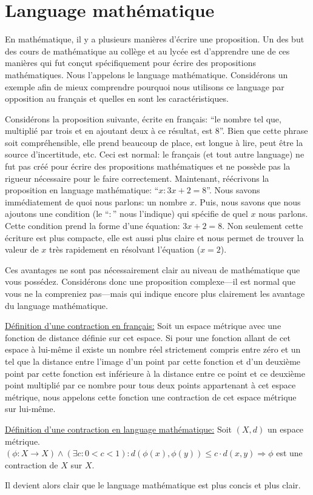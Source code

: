 \section{Language mathématique}

En mathématique, il y a plusieurs manières d'écrire une proposition. Un des but des cours de mathématique au collège et au lycée est d'apprendre une de ces manières qui fut conçut spécifiquement pour écrire des propositions mathématiques. Nous l'appelons le language mathématique. Considérons un exemple afin de mieux comprendre pourquoi nous utilisons ce language par opposition au français et quelles en sont les caractéristiques.

Considérons la proposition suivante, écrite en français: ``le nombre tel que, multiplié par trois et en ajoutant deux à ce résultat, est 8''. Bien que cette phrase soit compréhensible, elle prend beaucoup de place, est longue à lire, peut être la source d'incertitude, etc. Ceci est normal: le français (et tout autre language) ne fut pas créé pour écrire des propositions mathématiques et ne possède pas la rigueur nécessaire pour le faire correctement. Maintenant, réécrivons la proposition en language mathématique: ``$x : 3x+2 = 8$''. Nous savons immédiatement de quoi nous parlons: un nombre $x$. Puis, nous savons que nous ajoutons une condition (le ``$:$'' nous l'indique) qui spécifie de quel $x$ nous parlons. Cette condition prend la forme d'une équation: $3x+2 = 8$. Non seulement cette écriture est plus compacte, elle est aussi plus claire et nous permet de trouver la valeur de $x$ très rapidement en résolvant l'équation ($x = 2$).

\begin{exemple}
    Ces avantages ne sont pas nécessairement clair au niveau de mathématique que vous possédez. Considérons donc une proposition complexe---il est normal que vous ne la compreniez pas---mais qui indique encore plus clairement les avantage du language mathématique.

    \underline{Définition d'une contraction en français:} Soit un espace métrique avec une fonction de distance définie sur cet espace. Si pour une fonction allant de cet espace à lui-même il existe un nombre réel strictement compris entre zéro et un tel que la distance entre l'image d'un point par cette fonction et d'un deuxième point par cette fonction est inférieure à la distance entre ce point et ce deuxième point multiplié par ce nombre pour tous deux points appartenant à cet espace métrique, nous appelons cette fonction une contraction de cet espace métrique sur lui-même.

    \underline{Définition d'une contraction en language mathématique:} Soit $(X,d)$ un espace métrique. $(\phi \colon X \to X) \wedge (\exists c : 0<c<1) : d(\phi(x), \phi(y)) \leq c\cdot d(x,y) \Rightarrow \phi$ est une contraction de $X$ sur $X$.

    Il devient alors clair que le language mathématique est plus concis et plus clair.
\end{exemple}

